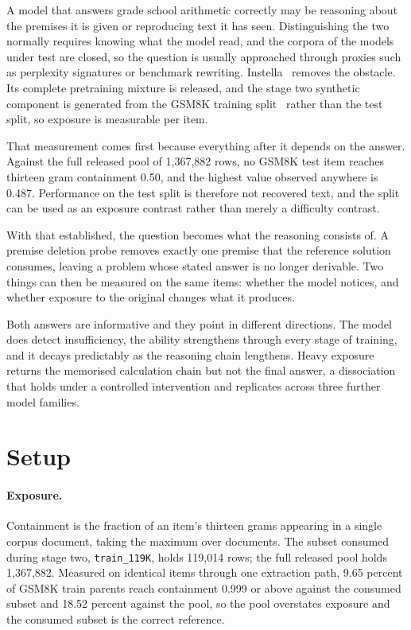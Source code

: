 A model that answers grade school arithmetic correctly may be reasoning about the premises it
is given or reproducing text it has seen. Distinguishing the two normally requires knowing
what the model read, and the corpora of the models under test are closed, so the question is
usually approached through proxies such as perplexity signatures or benchmark rewriting.
Instella~\citep{instella2025} removes the obstacle. Its complete pretraining mixture is
released, and the stage two synthetic component is generated from the GSM8K training
split~\citep{cobbe2021gsm8k} rather than the test split, so exposure is measurable per item.

That measurement comes first because everything after it depends on the answer. Against the
full released pool of 1{,}367{,}882 rows, no GSM8K test item reaches thirteen gram
containment 0.50, and the highest value observed anywhere is 0.487. Performance on the test
split is therefore not recovered text, and the split can be used as an exposure contrast
rather than merely a difficulty contrast.

With that established, the question becomes what the reasoning consists of. A premise
deletion probe removes exactly one premise that the reference solution consumes, leaving a
problem whose stated answer is no longer derivable. Two things can then be measured on the
same items: whether the model notices, and whether exposure to the original changes what it
produces.

Both answers are informative and they point in different directions. The model does detect
insufficiency, the ability strengthens through every stage of training, and it decays
predictably as the reasoning chain lengthens. Heavy exposure returns the memorised
calculation chain but not the final answer, a dissociation that holds under a controlled
intervention and replicates across three further model families.

\section{Setup}

\paragraph{Exposure.} Containment is the fraction of an item's thirteen grams appearing in a
single corpus document, taking the maximum over documents. The subset consumed during stage
two, \texttt{train\_119K}, holds 119{,}014 rows; the full released pool holds 1{,}367{,}882.
Measured on identical items through one extraction path, 9.65 percent of GSM8K train parents
reach containment 0.999 or above against the consumed subset and 18.52 percent against the
pool, so the pool overstates exposure and the consumed subset is the correct reference.

